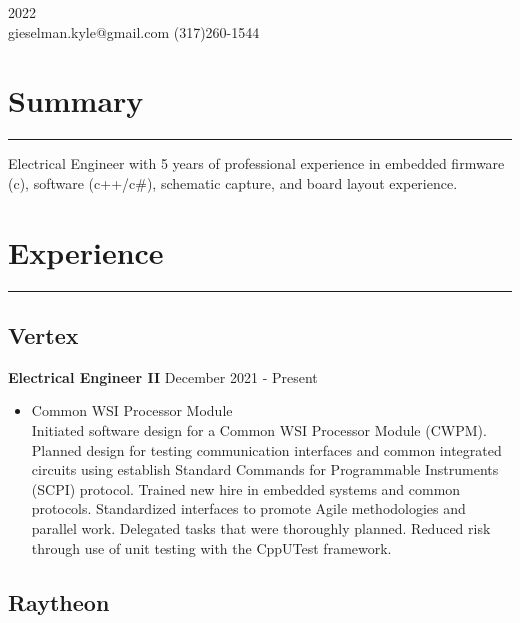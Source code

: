 \documentclass[10pt, letterpaper]{article}
\begin{document}
 \hfill 2022 \\
gieselman.kyle@gmail.com \hfill (317)260-1544 \\



\section*{Summary} \vspace{-2ex} \hrule
\vspace{1ex}

Electrical Engineer with 5 years of professional experience in embedded firmware
(c), software (c++/c\#), schematic capture, and board layout experience.



\section*{Experience} \vspace{-2ex} \hrule
\vspace{1ex}

\subsection*{Vertex}

\textbf{Electrical Engineer II} \hfill December 2021 - Present \\
\vspace{-4ex}
\begin{itemize}[noitemsep]
    \item Common WSI Processor Module \\
    Initiated software design for a Common WSI Processor Module (CWPM). Planned design for testing communication interfaces and common integrated circuits using establish Standard Commands for Programmable Instruments (SCPI) protocol. Trained new hire in embedded systems and common protocols. Standardized interfaces to promote Agile methodologies and parallel work. Delegated tasks that were thoroughly planned. Reduced risk through use of unit testing with the CppUTest framework.
\end{itemize}


\subsection*{Raytheon}
\end{document}
